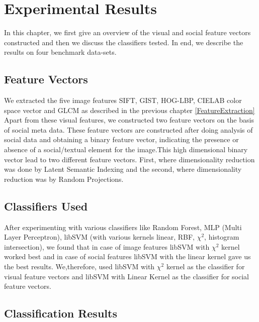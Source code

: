 
\chapter{Experimental Results} %


In this chapter, we first give an overview of the visual and social 
feature vectors constructed and then we discuss the classifiers 
tested. In end, we describe the results on four benchmark data-sets.

\section{Feature Vectors}
We extracted the five image features SIFT, GIST, HOG-LBP, CIELAB 
color space vector and GLCM as described in the previous chapter \ref{FeatureExtraction}
Apart from these visual features, we constructed two feature vectors on the basis of social meta data. These feature vectors are 
constructed after doing analysis of social data and obtaining a binary feature vector, indicating the presence or absence of a 
social/textual element for the image.This high dimensional binary vector lead to two different feature 
vectors. First, where dimensionality reduction was done by Latent Semantic Indexing and the second,  where dimensionality reduction was  by Random Projections.

\section{Classifiers Used}
After experimenting with various classifiers like Random Forest, MLP 
(Multi Layer Perceptron), libSVM (with various kernels linear, RBF, 
$\chi^2$, histogram intersection), we found that in case of 
image features libSVM with $\chi^2$ kernel worked best and in case of 
social features libSVM with the linear kernel gave us the best 
results. We,therefore, used libSVM with $\chi^2$ kernel as the classifier 
for visual feature vectors and libSVM with Linear Kernel as the
classifier for social feature vectors.


\section{Classification Results}


